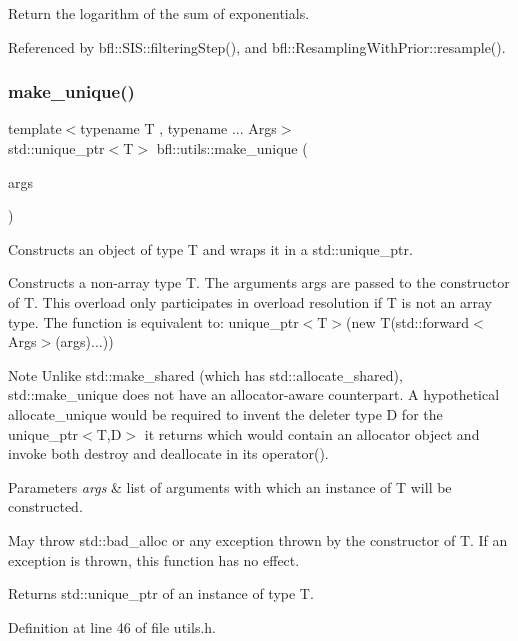 Return the logarithm of the sum of exponentials. 



Referenced by bfl\+::\+S\+I\+S\+::filtering\+Step(), and bfl\+::\+Resampling\+With\+Prior\+::resample().

\mbox{\label{namespacebfl_1_1utils_ad9e9288a23debabef8314ac0d1006e66}} 
\subsubsection{\texorpdfstring{make\+\_\+unique()}{make\_unique()}}
{\footnotesize\ttfamily template$<$typename T , typename ... Args$>$ \\
std\+::unique\+\_\+ptr$<$T$>$ bfl\+::utils\+::make\+\_\+unique (\begin{DoxyParamCaption}\item[{Args \&\&...}]{args }\end{DoxyParamCaption})}



Constructs an object of type T and wraps it in a std\+::unique\+\_\+ptr. 

Constructs a non-\/array type T. The arguments args are passed to the constructor of T. This overload only participates in overload resolution if T is not an array type. The function is equivalent to\+: unique\+\_\+ptr$<$\+T$>$(new T(std\+::forward$<$\+Args$>$(args)...))

\begin{DoxyNote}{Note}
Unlike std\+::make\+\_\+shared (which has std\+::allocate\+\_\+shared), std\+::make\+\_\+unique does not have an allocator-\/aware counterpart. A hypothetical allocate\+\_\+unique would be required to invent the deleter type D for the unique\+\_\+ptr$<$\+T,\+D$>$ it returns which would contain an allocator object and invoke both destroy and deallocate in its operator().
\end{DoxyNote}

\begin{DoxyParams}{Parameters}
{\em args} & list of arguments with which an instance of T will be constructed.\\
\hline
\end{DoxyParams}
May throw std\+::bad\+\_\+alloc or any exception thrown by the constructor of T. If an exception is thrown, this function has no effect.

\begin{DoxyReturn}{Returns}
std\+::unique\+\_\+ptr of an instance of type T. 
\end{DoxyReturn}


Definition at line 46 of file utils.\+h.

